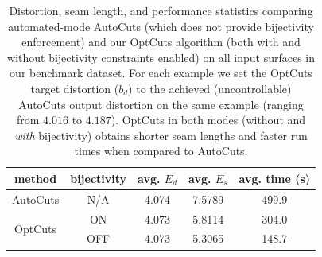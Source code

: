 \begin{table}[t]
\centering
\small
\caption{
Distortion, seam length, and performance statistics comparing automated-mode AutoCuts (which does not provide bijectivity enforcement) and our OptCuts algorithm (both with and without bijectivity constraints enabled) on all input surfaces in our benchmark dataset. For each example we set the OptCuts target distortion ($b_d$) to the achieved (uncontrollable) AutoCuts output distortion on the same example (ranging from $4.016$ to $4.187$). OptCuts in both modes (without and \emph{with} bijectivity) obtains shorter seam lengths and faster run times when compared to AutoCuts.}
\label{tb:comp_AutoCuts}
\vspace{-0.3cm}
\begin{tabular}{|c|c|c|c|c|}
\hline
method                   & bijectivity & avg. $E_{d}$ & avg. $E_{s}$ & avg. time (s) \\ \hline
AutoCuts                 & N/A         & 4.074        & 7.5789       & 499.9         \\ \hline
\multirow{2}{*}{OptCuts} & ON          & 4.073        & 5.8114       & 304.0         \\
                         & OFF         & 4.073        & 5.3065       & 148.7         \\ \hline
\end{tabular}
\vspace{-0.3cm}
\end{table}

